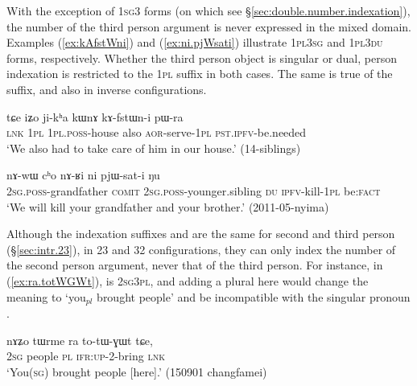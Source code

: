 With the exception of  \textsc{1sg}\fl{}3 forms (on which see §\ref{sec:double.number.indexation}), the number of the third person argument is never expressed in the mixed domain. Examples (\ref{ex:kAfstWni}) and (\ref{ex:ni.pjWsati}) illustrate \textsc{1pl}\fl{}\textsc{3sg} and \textsc{1pl}\fl{}\textsc{3du} forms, respectively. Whether the third person object is singular or dual, person indexation is restricted to the \textsc{1pl}  suffix in both cases. The same is true of the  suffix, and also in inverse configurations.
\largerpage
\begin{exe}
\ex   \label{ex:kAfstWni}
\gll tɕe iʑo ji-kʰa kɯnɤ kɤ-fstɯn-i pɯ-ra \\
\textsc{lnk} \textsc{1pl} \textsc{1pl}.\textsc{poss}-house also \textsc{aor}-serve-\textsc{1pl} \textsc{pst}.\textsc{ipfv}-be.needed \\
\glt `We also had to take care of him in our house.' (14-siblings)
\end{exe}
 
\begin{exe}
\ex   \label{ex:ni.pjWsati}
\gll   nɤ-wɯ cʰo nɤ-ʁi ni pjɯ-sat-i ŋu \\
\textsc{2sg}.\textsc{poss}-grandfather \textsc{comit} \textsc{2sg}.\textsc{poss}-younger.sibling \textsc{du} \textsc{ipfv}-kill-\textsc{1pl} be:\textsc{fact} \\
\glt `We will kill your grandfather and your brother.' (2011-05-nyima)
\end{exe}

Although the indexation suffixes  and  are the same for second and third person (§\ref{sec:intr.23}), in 2\fl{}3 and 3\fl{}2 configurations, they can only index the number of the second person argument, never that of the third person. For instance, in (\ref{ex:ra.totWGWt}),  is \textsc{2sg}\fl{}\textsc{3pl}, and adding a plural  here would change the meaning to `you$_{pl}$ brought people' and be incompatible with the singular pronoun .

\begin{exe}
\ex   \label{ex:ra.totWGWt}
\gll    nɤʑo tɯrme ra to-tɯ-ɣɯt tɕe, \\
\textsc{2sg} people \textsc{pl} \textsc{ifr}:\textsc{up}-2-bring \textsc{lnk} \\
\glt `You(\textsc{sg}) brought people [here].' (150901 changfamei)
\end{exe}

